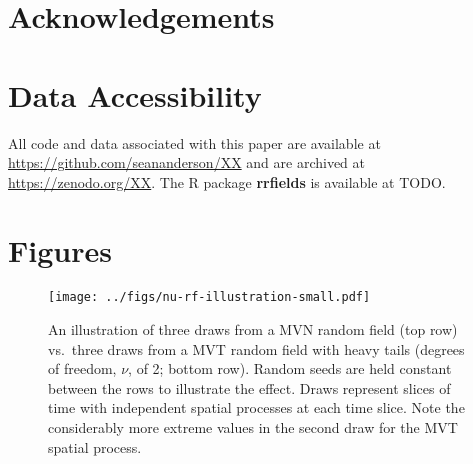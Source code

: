 \documentclass[12pt,english]{article}
\begin{document}
\begin{spacing}{1.3}

\section{Acknowledgements}

\section{Data Accessibility}

All code and data associated with this paper are available at
\url{https://github.com/seananderson/XX} and are archived at
\url{https://zenodo.org/XX}.
The R package \textbf{rrfields} is available at TODO.



\clearpage

\section{Figures}

\begin{figure}[htb]
  \begin{center}
    \texttt{[image: ../figs/nu-rf-illustration-small.pdf]}
    \caption{An illustration of three draws from a MVN random field (top row)
      vs.\ three draws from a MVT random field with heavy tails
      (degrees of freedom, $\nu$, of 2; bottom row). Random seeds are held constant
      between the rows
      to illustrate the effect. Draws represent slices of time with independent spatial
      processes at each time slice. Note the considerably more extreme values in
      the second draw for the MVT spatial process.}
    \label{fig:nu}
  \end{center}
\end{figure}


\end{spacing}
\end{document}
